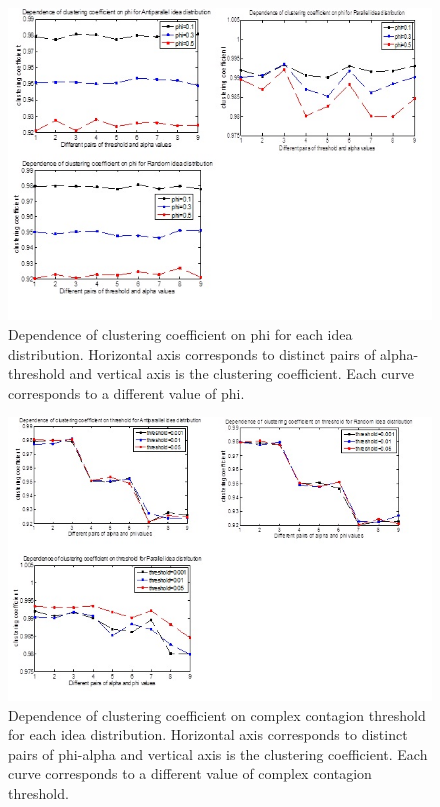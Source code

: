 \documentclass{beamer}
\begin{document}
\begin{frame}
\begin{figure}
[htp]
\begin{center}
\includegraphics{Fig16}
\end{center}
\caption{ Dependence of clustering coefficient on phi for each idea distribution. Horizontal axis corresponds to distinct pairs of alpha-     threshold and   vertical axis is the clustering coefficient. Each curve corresponds to a different value of phi.}
\label {fig16}
\end{figure}

\begin{figure}
[htp]
\begin{center}
\includegraphics{Fig19}
\end{center}
\caption{Dependence of clustering coefficient on complex contagion threshold for each idea distribution. Horizontal axis corresponds to distinct pairs of phi-alpha and   vertical axis is the clustering coefficient. Each curve corresponds to a different value of complex contagion threshold.}
\label {fig19}
\end{figure}

\end{frame}
\end{document}
